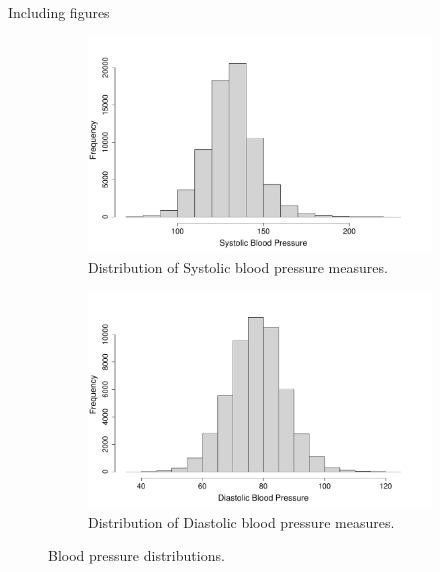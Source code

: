 \begin{frame}{Including figures}
\begin{figure}[H]
     \centering
     \begin{subfigure}[b]{0.49\linewidth}
        \centering
        \includegraphics[width=\linewidth]{Images/hist_sys.pdf}
        \caption{Distribution of Systolic blood pressure measures.}
        \label{fig:hist_sys}
     \end{subfigure}
     \hfill
     \begin{subfigure}[b]{0.49\linewidth}
        \centering
        \includegraphics[width=\linewidth]{Images/hist_dia.pdf}
        \caption{Distribution of Diastolic blood pressure measures.}
        \label{fig:hist_dia}
     \end{subfigure}
     \caption{Blood pressure distributions.}
     \label{fig:hist_long}
\end{figure}

\end{frame}

